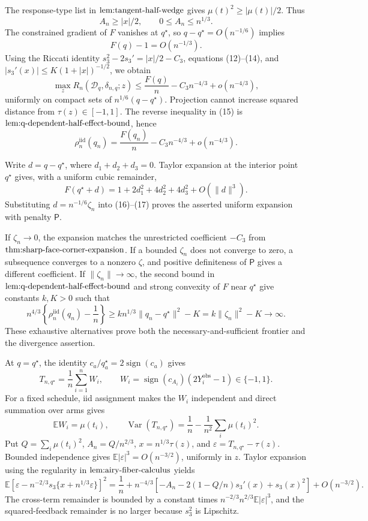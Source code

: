 The response-type list in \(\textnormal{lem:tangent-half-wedge}\) gives \(\mu(t)^2\geq|\mu(t)|/2\).  Thus
\[
A_n\geq |x|/2,
\qquad 0\leq A_n\leq n^{1/3}.
\tag{13}
\]
The constrained gradient of \(F\) vanishes at \(q^\star\), so \(q-q^\star=O(n^{-1/6})\) implies
\[
F(q)-1=O(n^{-1/3}).
\tag{14}
\]
Using the Riccati identity \(s_3^2-2s_3'=|x|/2-C_3\), equations (12)--(14), and \(|s_3'(x)|\leq K(1+|x|)^{-1/2}\), we obtain
\[
\max_zR_n(\mathcal D_q,\delta_{n,q};z)
\leq\frac{F(q)}n-C_3n^{-4/3}+o(n^{-4/3}),
\tag{15}
\]
uniformly on compact sets of \(n^{1/6}(q-q^\star)\).  Projection cannot increase squared distance from \(\tau(z)\in[-1,1]\).  The reverse inequality in (15) is \(\textnormal{lem:q-dependent-half-effect-bound}\), hence
\[
\rho_n^{\mathrm{iid}}(q_n)
=\frac{F(q_n)}n-C_3n^{-4/3}+o(n^{-4/3}).
\tag{16}
\]

Write \(d=q-q^\star\), where \(d_1+d_2+d_3=0\).  Taylor expansion at the interior point \(q^\star\) gives, with a uniform cubic remainder,
\[
F(q^\star+d)
=1+2d_1^2+4d_2^2+4d_3^2+O(\|d\|^3).
\tag{17}
\]
Substituting \(d=n^{-1/6}\zeta_n\) into (16)--(17) proves the asserted uniform expansion with penalty \(\mathsf P\).

If \(\zeta_n\to0\), the expansion matches the unrestricted coefficient \(-C_3\) from \(\textnormal{thm:sharp-face-corner-expansion}\).  If a bounded \(\zeta_n\) does not converge to zero, a subsequence converges to a nonzero \(\zeta\), and positive definiteness of \(\mathsf P\) gives a different coefficient.  If \(\|\zeta_n\|\to\infty\), the second bound in \(\textnormal{lem:q-dependent-half-effect-bound}\) and strong convexity of \(F\) near \(q^\star\) give constants \(k,K>0\) such that
\[
n^{4/3}\left\{\rho_n^{\mathrm{iid}}(q_n)-\frac1n\right\}
\geq k n^{1/3}\|q_n-q^\star\|^2-K
=k\|\zeta_n\|^2-K\longrightarrow\infty.
\]
These exhaustive alternatives prove both the necessary-and-sufficient frontier and the divergence assertion.

At \(q=q^\star\), the identity \(c_a/q_a^\star=2\operatorname{sign}(c_a)\) gives
\[
T_{n,q^\star}=\frac1n\sum_{i=1}^n W_i,
\qquad
W_i=\operatorname{sign}(c_{A_i})(2Y_i^{\mathrm{obs}}-1)\in\{-1,1\}.
\]
For a fixed schedule, iid assignment makes the \(W_i\) independent and direct summation over arms gives
\[
\mathbb EW_i=\mu(t_i),
\qquad
\operatorname{Var}(T_{n,q^\star})
=\frac1n-\frac1{n^2}\sum_i\mu(t_i)^2.
\tag{18}
\]
Put \(Q=\sum_i\mu(t_i)^2\), \(A_n=Q/n^{2/3}\), \(x=n^{1/3}\tau(z)\), and \(\varepsilon=T_{n,q^\star}-\tau(z)\).  Bounded independence gives \(\mathbb E|\varepsilon|^3=O(n^{-3/2})\), uniformly in \(z\).  Taylor expansion using the regularity in \(\textnormal{lem:airy-fiber-calculus}\) yields
\[
\mathbb E\left[
\varepsilon-n^{-2/3}s_3\{x+n^{1/3}\varepsilon\}
\right]^2
=\frac1n+n^{-4/3}
\left[-A_n-2(1-Q/n)s_3'(x)+s_3(x)^2\right]
+O(n^{-3/2}).
\tag{19}
\]
The cross-term remainder is bounded by a constant times \(n^{-2/3}n^{2/3}\mathbb E|\varepsilon|^3\), and the squared-feedback remainder is no larger because \(s_3^2\) is Lipschitz.

